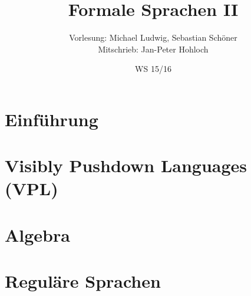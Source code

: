 \documentclass[german,a4paper,10pt]{scrreprt}
\title{Formale Sprachen II}
\author{Vorlesung: Michael Ludwig, Sebastian Schöner\\
Mitschrieb: Jan-Peter Hohloch}
\date{WS 15/16}
\begin{document}
    \maketitle
    \tableofcontents
    \newpage
    \chapter{Einführung}
        
    \chapter{Visibly Pushdown Languages (VPL)}
        
    \chapter{Algebra}
        
    \chapter{Reguläre Sprachen}
        
\end{document}
